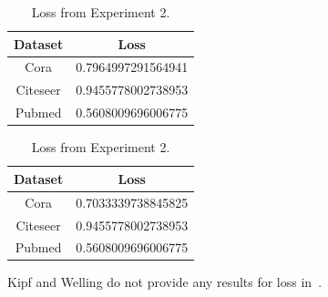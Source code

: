 \begin {table}[ht]
\parbox{.45\linewidth}{
\begin{center}
  \begin{tabular}{|c|c|}
  \hline
  Dataset       &  Loss\\ \hline
  Cora          & 0.7964997291564941 \\ 
  Citeseer      & 0.9455778002738953 \\
  Pubmed        & 0.5608009696006775 \\
  \hline
  \end{tabular}
\end{center}
\caption {Loss from Experiment 1.} \label{tab:loss1} 
}
\hfill
\parbox{.45\linewidth}{
\begin{center}
  \begin{tabular}{|c|c|}
  \hline
  Dataset       &  Loss\\ \hline
  Cora          & 0.7033339738845825 \\ 
  Citeseer      & 0.9455778002738953 \\
  Pubmed        & 0.5608009696006775 \\
  \hline
  \end{tabular}
\end{center}
\caption {Loss from Experiment 2.} \label{tab:loss2} 
}
\end{table}

Kipf and Welling do not provide any results for loss in~\cite{Kipf2016}.